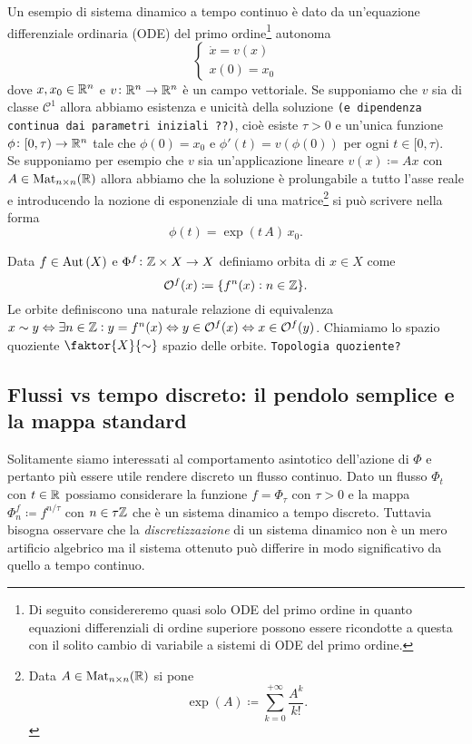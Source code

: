 Un esempio di sistema dinamico a tempo continuo è dato da un'equazione differenziale ordinaria (ODE) del primo ordine\footnote{Di seguito considereremo quasi solo ODE del primo ordine in quanto equazioni differenziali di ordine superiore possono essere ricondotte a questa con il solito cambio di variabile a sistemi di ODE del primo ordine.} autonoma
\begin{equation} \label{eqn:ode-I-ordine}
	\begin{cases}
		\dot{x} = v(x) \\
		x(0) = x_0
	\end{cases}
\end{equation} 
dove $ x, x_0 \in \mathbb{R}^n $ e $ v \colon \mathbb{R}^n \to \mathbb{R}^n $ è un campo vettoriale. Se supponiamo che $ v $ sia di classe $ \mathcal{C}^1 $ allora abbiamo esistenza e unicità della soluzione \texttt{(e dipendenza continua dai parametri iniziali ??)}, cioè esiste $ \tau > 0 $ e un'unica funzione $ \phi \colon [0, \tau) \to \mathbb{R}^n $ tale che $ \phi(0) = x_0 $ e $ \phi'(t) = v(\phi(0)) $ per ogni $ t \in [0, \tau) $. \\
Se supponiamo per esempio che $ v $ sia un'applicazione lineare $ v(x) \coloneqq A x $ con $ A \in \mathrm{Mat}_{n \times n}(\mathbb{R}) $ allora abbiamo che la soluzione è prolungabile a tutto l'asse reale e introducendo la nozione di esponenziale di una matrice\footnote{%
	Data $ A \in \mathrm{Mat}_{n \times n}(\mathbb{R}) $ si pone 
	\[ \exp(A) \coloneqq \sum_{k = 0}^{+\infty} \frac{A^k}{k!}. \] 
}
si può scrivere nella forma 
\[ \phi(t) = \exp{\left(t \, A\right)} \, x_0. \]

\begin{definition}
	Data $ f \in \operatorname{Aut}{(X)} $ e $ \Phi^f \colon \mathbb{Z} \times X \to X $ definiamo orbita di $ x \in X $ come 
	\[
	\mathcal{O}^f(x) \coloneqq \{f^n(x) : n \in \mathbb{Z}\}.
	\]
	Le orbite definiscono una naturale relazione di equivalenza $ x \sim y \Leftrightarrow \exists n \in \mathbb{Z} : y = f^n(x) \Leftrightarrow y \in \mathcal{O}^f(x) \Leftrightarrow x \in \mathcal{O}^f(y) $. Chiamiamo lo spazio quoziente $ \faktor{X}{\sim} $ spazio delle orbite. \texttt{Topologia quoziente?}
\end{definition}

\subsection{Flussi vs tempo discreto: il pendolo semplice e la mappa standard}
Solitamente siamo interessati al comportamento asintotico dell'azione di $ \Phi $ e pertanto più essere utile rendere discreto un flusso continuo. Dato un flusso $ \Phi_t $ con $ t \in \mathbb{R} $ possiamo considerare la funzione $ f = \Phi_{\tau} $ con $ \tau > 0 $ e la mappa $ \Phi_n^f \coloneqq f^{n/\tau} $ con $ n \in \tau \mathbb{Z} $ che è un sistema dinamico a tempo discreto. Tuttavia bisogna osservare che la \emph{discretizzazione} di un sistema dinamico non è un mero artificio algebrico ma il sistema ottenuto può differire in modo significativo da quello a tempo continuo. 


